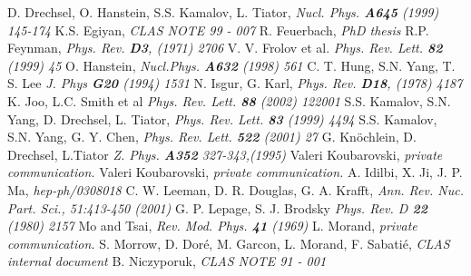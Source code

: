 \begin{singlespace}
\begin{thebibliography}{99}
   {D. Drechsel,  O. Hanstein,  S.S. Kamalov, L. Tiator},      \textit{Nucl. Phys. {\bf A645} (1999) 145-174}
      {K.S. Egiyan},                                              \textit{CLAS NOTE 99 - 007} 
  {R. Feuerbach},                                             \textit{PhD thesis}  
    {R.P. Feynman},                                             \textit{Phys. Rev. {\bf D3}, (1971) 2706}  
     {V. V. Frolov et al.}                                       \textit{Phys. Rev. Lett. {\bf 82} (1999) 45} 
     {O. Hanstein},                                              \textit{Nucl.Phys. {\bf A632} (1998) 561}
       {C. T. Hung, S.N. Yang, T. S. Lee}                          \textit{J. Phys {\bf G20} (1994) 1531}
  {N. Isgur, G. Karl},                                        \textit{Phys. Rev. {\bf D18}, (1978) 4187}    
    {K. Joo, L.C. Smith et al}                                  \textit{Phys. Rev. Lett. {\bf 88} (2002) 122001}
    {S.S. Kamalov, S.N. Yang, D. Drechsel, L. Tiator},          \textit{Phys. Rev. Lett. {\bf 83} (1999) 4494} 
    {S.S. Kamalov, S.N. Yang, G. Y. Chen},                      \textit{Phys. Rev. Lett. {\bf 522} (2001) 27}  
     {G. Kn\"ochlein, D. Drechsel, L.Tiator}                     \textit{Z. Phys. {\bf A352} 327-343,(1995)} 
    {Valeri Koubarovski},                                       \textit{private communication.} 
    {Valeri Koubarovski},                                       \textit{private communication.}   
        {A. Idilbi, X. Ji, J. P. Ma},                               \textit{hep-ph/0308018}    
    {C. W. Leeman, D. R. Douglas, G. A. Krafft},                \textit{Ann. Rev. Nuc. Part. Sci., 51:413-450 (2001)}   
     {G. P. Lepage, S. J. Brodsky}                               \textit{Phys. Rev. D {\bf 22} (1980) 2157}
     {Mo and Tsai},                                              \textit{Rev. Mod. Phys. {\bf 41} (1969)}
       {L. Morand},                                                \textit{private communication.}      
  {S. Morrow, D. Dor\'e, M. Garcon, L. Morand, F. Sabati\'e}, \textit{CLAS internal document} 
   {B. Niczyporuk},                                            \textit{CLAS NOTE 91 - 001} 

\end{thebibliography}
\end{singlespace}
